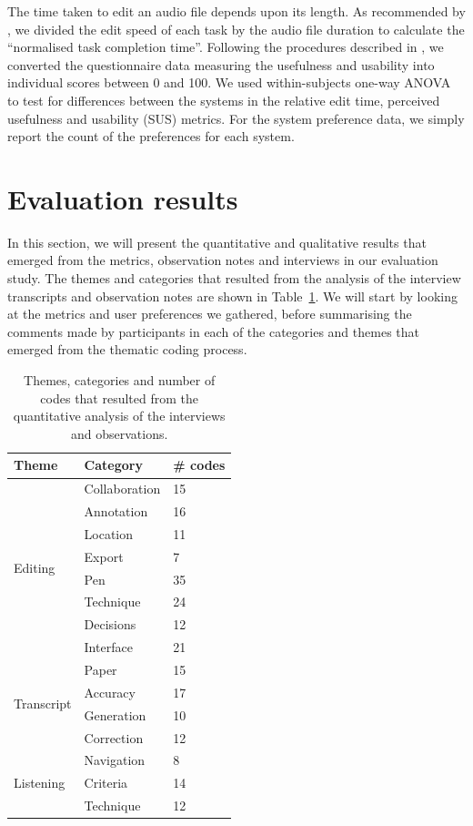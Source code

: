 The time taken to edit an audio file depends upon its length.  As recommended by \citet{Dewey2014}, we divided the edit
speed of each task by the audio file duration to calculate the ``normalised task completion time''.  Following the
procedures described in \citet{Davis1989,Brooke1996}, we converted the questionnaire data measuring the usefulness and
usability into individual scores between 0 and 100. We used within-subjects one-way ANOVA \citep{Rouanet1970} to test
for differences between the systems in the relative edit time, perceived usefulness and usability (SUS) metrics.  For
the system preference data, we simply report the count of the preferences for each system.





\section{Evaluation results}\label{sec:paper-results}

In this section, we will present the quantitative and qualitative results that emerged from the metrics, observation
notes and interviews in our evaluation study.  The themes and categories that resulted from the analysis of the
interview transcripts and observation notes are shown in Table~\ref{tab:paper-codes}.  We will start by looking at the
metrics and user preferences we gathered, before summarising the comments made by participants in each of the
categories and themes that emerged from the thematic coding process.

\begin{table}[p]
  \centering
  {\small
    \begin{tabular}{l l l} %
      \hline
      \textbf{Theme} & \textbf{Category} & \textbf{\# codes} \\ \hline
      \multirow{8}{*}{Editing}
      & Collaboration & 15 \\ %
      & Annotation & 16 \\ %
      & Location & 11 \\ %
      & Export & 7 \\ %
      & Pen & 35 \\ %
      & Technique & 24 \\ %
      & Decisions & 12 \\ %
      & Interface & 21 \\ \hline %
      \multirow{4}{*}{Transcript}
      & Paper & 15 \\ %
      & Accuracy & 17 \\ %
      & Generation & 10 \\ %
      & Correction & 12 \\ \hline %
      \multirow{3}{*}{Listening}
      & Navigation & 8 \\ %
      & Criteria & 14 \\ %
      & Technique & 12 \\ \hline %

    \end{tabular}
  }
  \caption{Themes, categories and number of codes that resulted from the quantitative analysis of the interviews and
  observations.}
  \label{tab:paper-codes}
\end{table}


